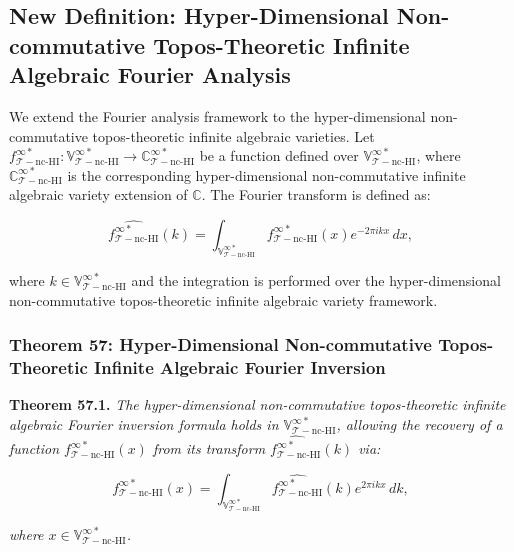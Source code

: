 \documentclass{article}
\begin{document}
\subsection{New Definition: Hyper-Dimensional Non-commutative Topos-Theoretic Infinite Algebraic Fourier Analysis}
We extend the Fourier analysis framework to the hyper-dimensional non-commutative topos-theoretic infinite algebraic varieties. Let \(f_{\mathcal{T}-\text{nc-HI}}^{\infty *}: \mathbb{V}_{\mathcal{T}-\text{nc-HI}}^{\infty *} \to \mathbb{C}_{\mathcal{T}-\text{nc-HI}}^{\infty *}\) be a function defined over \(\mathbb{V}_{\mathcal{T}-\text{nc-HI}}^{\infty *}\), where \(\mathbb{C}_{\mathcal{T}-\text{nc-HI}}^{\infty *}\) is the corresponding hyper-dimensional non-commutative infinite algebraic variety extension of \(\mathbb{C}\). The Fourier transform is defined as:

\[
\widehat{f_{\mathcal{T}-\text{nc-HI}}^{\infty *}}(k) = \int_{\mathbb{V}_{\mathcal{T}-\text{nc-HI}}^{\infty *}} f_{\mathcal{T}-\text{nc-HI}}^{\infty *}(x) e^{-2\pi i k x} \, dx,
\]

where \(k \in \mathbb{V}_{\mathcal{T}-\text{nc-HI}}^{\infty *}\) and the integration is performed over the hyper-dimensional non-commutative topos-theoretic infinite algebraic variety framework.

\subsubsection{Theorem 57: Hyper-Dimensional Non-commutative Topos-Theoretic Infinite Algebraic Fourier Inversion}
\textbf{Theorem 57.1.} \textit{The hyper-dimensional non-commutative topos-theoretic infinite algebraic Fourier inversion formula holds in \(\mathbb{V}_{\mathcal{T}-\text{nc-HI}}^{\infty *}\), allowing the recovery of a function \(f_{\mathcal{T}-\text{nc-HI}}^{\infty *}(x)\) from its transform \(\widehat{f_{\mathcal{T}-\text{nc-HI}}^{\infty *}}(k)\) via:}

\[
f_{\mathcal{T}-\text{nc-HI}}^{\infty *}(x) = \int_{\mathbb{V}_{\mathcal{T}-\text{nc-HI}}^{\infty *}} \widehat{f_{\mathcal{T}-\text{nc-HI}}^{\infty *}}(k) e^{2\pi i k x} \, dk,
\]

\textit{where \(x \in \mathbb{V}_{\mathcal{T}-\text{nc-HI}}^{\infty *}\).}
\end{document}
